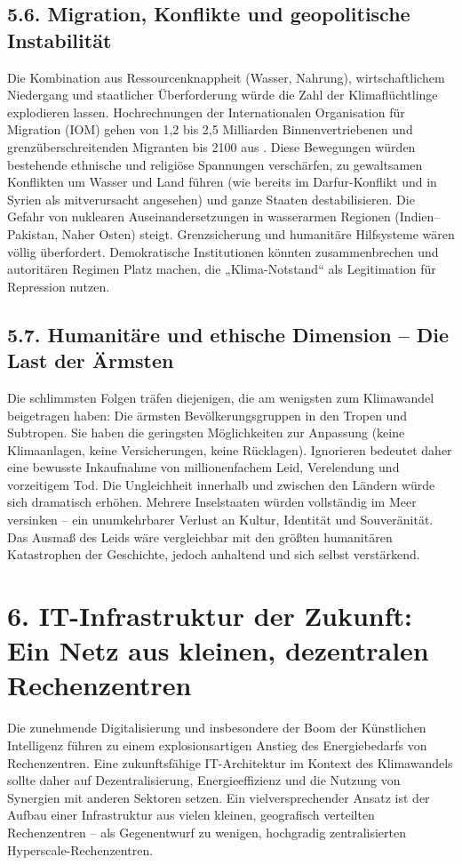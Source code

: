 \documentclass[12pt, a4paper]{article}
\begin{document}
	\subsection*{5.6. Migration, Konflikte und geopolitische Instabilität}
	Die Kombination aus Ressourcenknappheit (Wasser, Nahrung), wirtschaftlichem Niedergang und
	staatlicher Überforderung würde die Zahl der Klimaflüchtlinge explodieren lassen. Hochrechnungen
	der Internationalen Organisation für Migration (IOM) gehen von 1,2 bis 2,5 Milliarden
	Binnenvertriebenen und grenzüberschreitenden Migranten bis 2100 aus \cite{iom2025}. Diese
	Bewegungen würden bestehende ethnische und religiöse Spannungen verschärfen, zu gewaltsamen
	Konflikten um Wasser und Land führen (wie bereits im Darfur-Konflikt und in Syrien als
	mitverursacht angesehen) und ganze Staaten destabilisieren. Die Gefahr von nuklearen
	Auseinandersetzungen in wasserarmen Regionen (Indien–Pakistan, Naher Osten) steigt.
	Grenzsicherung und humanitäre Hilfsysteme wären völlig überfordert. Demokratische
	Institutionen könnten zusammenbrechen und autoritären Regimen Platz machen, die „Klima-Notstand“
	als Legitimation für Repression nutzen.
	
	\subsection*{5.7. Humanitäre und ethische Dimension – Die Last der Ärmsten}
	Die schlimmsten Folgen träfen diejenigen, die am wenigsten zum Klimawandel beigetragen
	haben: Die ärmsten Bevölkerungsgruppen in den Tropen und Subtropen. Sie haben die geringsten
	Möglichkeiten zur Anpassung (keine Klimaanlagen, keine Versicherungen, keine Rücklagen).
	Ignorieren bedeutet daher eine bewusste Inkaufnahme von millionenfachem Leid, Verelendung
	und vorzeitigem Tod. Die Ungleichheit innerhalb und zwischen den Ländern würde sich
	dramatisch erhöhen. Mehrere Inselstaaten würden vollständig im Meer versinken – ein
	unumkehrbarer Verlust an Kultur, Identität und Souveränität. Das Ausmaß des Leids wäre
	vergleichbar mit den größten humanitären Katastrophen der Geschichte, jedoch anhaltend
	und sich selbst verstärkend.
	
	\section*{6. IT-Infrastruktur der Zukunft: Ein Netz aus kleinen, dezentralen Rechenzentren}
	
	Die zunehmende Digitalisierung und insbesondere der Boom der Künstlichen Intelligenz
	führen zu einem explosionsartigen Anstieg des Energiebedarfs von Rechenzentren. Eine
	zukunftsfähige IT-Architektur im Kontext des Klimawandels sollte daher auf Dezentralisierung,
	Energieeffizienz und die Nutzung von Synergien mit anderen Sektoren setzen. Ein
	vielversprechender Ansatz ist der Aufbau einer Infrastruktur aus vielen kleinen,
	geografisch verteilten Rechenzentren – als Gegenentwurf zu wenigen, hochgradig zentralisierten
	Hyperscale-Rechenzentren.
	
\end{document}
